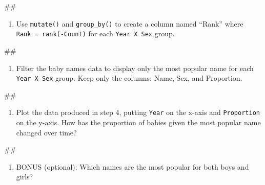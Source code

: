 \documentclass[]{book}
\newenvironment{Shaded}{\begin{snugshade}}{\end{snugshade}}
\newcommand{\NormalTok}[1]{#1}
\providecommand{\tightlist}{%
  \setlength{\itemsep}{0pt}\setlength{\parskip}{0pt}}
\begin{document}
\begin{Shaded}
\begin{Highlighting}[]
\NormalTok{## }
\end{Highlighting}
\end{Shaded}

\begin{enumerate}
\def\labelenumi{\arabic{enumi}.}
\setcounter{enumi}{1}
\tightlist
\item
  Use \texttt{mutate()} and \texttt{group\_by()} to create a column
  named ``Rank'' where \texttt{Rank\ =\ rank(-Count)} for each
  \texttt{Year\ X\ Sex} group.
\end{enumerate}

\begin{Shaded}
\begin{Highlighting}[]
\NormalTok{##}
\end{Highlighting}
\end{Shaded}

\begin{enumerate}
\def\labelenumi{\arabic{enumi}.}
\setcounter{enumi}{2}
\tightlist
\item
  Filter the baby names data to display only the most popular name for
  each \texttt{Year\ X\ Sex} group. Keep only the columns: Name, Sex,
  and Proportion.
\end{enumerate}

\begin{Shaded}
\begin{Highlighting}[]
\NormalTok{##}
\end{Highlighting}
\end{Shaded}

\begin{enumerate}
\def\labelenumi{\arabic{enumi}.}
\setcounter{enumi}{3}
\tightlist
\item
  Plot the data produced in step 4, putting \texttt{Year} on the x-axis
  and \texttt{Proportion} on the y-axis. How has the proportion of
  babies given the most popular name changed over time?
\end{enumerate}

\begin{Shaded}
\begin{Highlighting}[]
\NormalTok{##}
\end{Highlighting}
\end{Shaded}

\begin{enumerate}
\def\labelenumi{\arabic{enumi}.}
\setcounter{enumi}{4}
\tightlist
\item
  BONUS (optional): Which names are the most popular for both boys and
  girls?
\end{enumerate}
\end{document}
